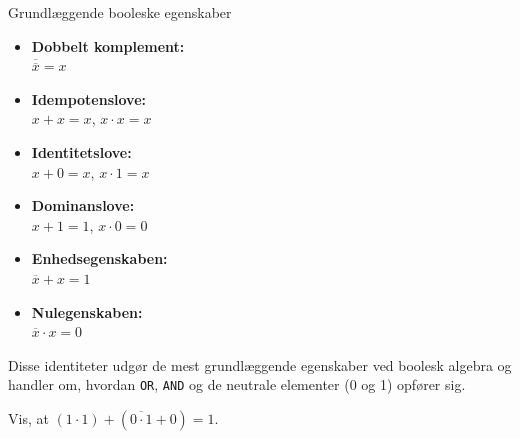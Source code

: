 \begin{custombox}{Grundlæggende booleske egenskaber}
\begin{itemize}
    \item \textbf{Dobbelt komplement:} \\
    \hspace*{15pt} $\overline{\overline{x}} = x$\hspace{15pt}
    
    \item \textbf{Idempotenslove:} \\
    \hspace*{15pt}$x + x = x$, \quad $x \cdot x = x$
    
    \item \textbf{Identitetslove:} \\
    \hspace*{15pt}$x + 0 = x$, \quad $x \cdot 1 = x$
    
    \item \textbf{Dominanslove:} \\
    \hspace*{15pt}$x + 1 = 1$, \quad $x \cdot 0 = 0$
    
    \item \textbf{Enhedsegenskaben:} \\
    \hspace*{15pt}$\overline{x} + x = 1$
    
    \item \textbf{Nulegenskaben:} \\
    \hspace*{15pt} $\overline{x} \cdot x = 0$
\end{itemize}
\end{custombox}

Disse identiteter udgør de mest grundlæggende egenskaber ved boolesk algebra og handler om, hvordan \texttt{OR}, \texttt{AND} og de neutrale elementer (0 og 1) opfører sig.

\begin{example} Vis, at $(1 \cdot 1)+(\overline{0 \cdot 1}+0)=1$.         
\end{example}


